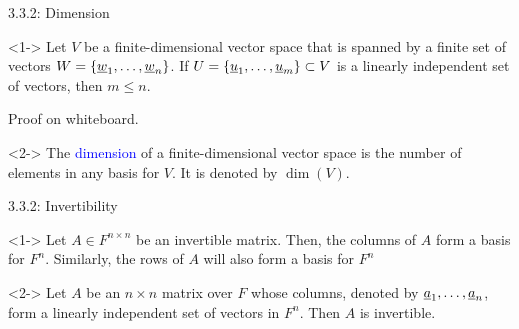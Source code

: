 \documentclass[10pt,letterpaper,english]{beamer}
\begin{document}
\begin{frame}{3.3.2: Dimension}

\begin{theorem}<1-> 
Let $V$ be a finite-dimensional  vector space that is spanned by a finite set of vectors $W = \left\{ \underline{w}_1, \ldots, \underline{w}_n \right\}$.
If $U = \left\{ \underline{u}_1, \ldots, \underline{u}_m \right\} \subset V$ is a linearly independent set of vectors, then $m\leq n$.
\end{theorem}

 {Proof on whiteboard.}

\vspace{3mm}

\begin{definition}<2->
The \textcolor{blue}{dimension} of a finite-dimensional vector space is the number of elements in any basis for $V$.
It is denoted by $\dim(V)$.
\end{definition}

\end{frame}

\begin{frame}{3.3.2: Invertibility}

\begin{lemma}<1->
Let $A\in F^{n \times n}$ be an invertible matrix.
Then, the columns of $A$ form a basis for $F^n$.
Similarly, the rows of $A$ will also form a basis for $F^n$
\end{lemma}


\vspace{3mm}

\begin{theorem}<2->
Let $A$ be an $n \times n$ matrix over $F$ whose columns, denoted by $\underline{a}_1, \ldots, \underline{a}_n$, form a linearly independent set of vectors in $F^{n}$.
Then $A$ is invertible.
\end{theorem}


\end{frame}
\end{document}
